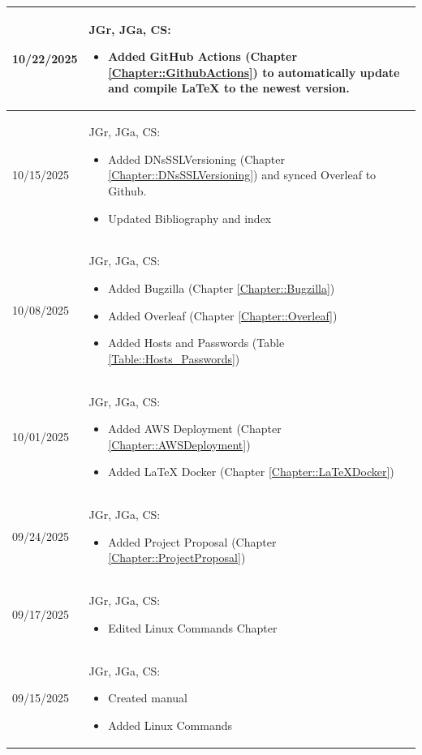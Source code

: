 \begin{longtable}{|l||p{12.5cm}|}
10/22/2025 & JGr, JGa, CS:
\begin{itemize}[topsep=0pt,itemsep=0pt,parsep=0pt,partopsep=0pt,leftmargin=12pt]
\item Added GitHub Actions (Chapter \ref{Chapter::GithubActions}) to automatically update and compile LaTeX to the newest version.
\end{itemize} 
\\ \hline

10/15/2025 & JGr, JGa, CS:
\begin{itemize}[topsep=0pt,itemsep=0pt,parsep=0pt,partopsep=0pt,leftmargin=12pt]
\item Added DNsSSLVersioning (Chapter \ref{Chapter::DNsSSLVersioning}) and synced Overleaf to Github.
\item Updated Bibliography and index
\end{itemize} 
\\ \hline

10/08/2025 & JGr, JGa, CS:
\begin{itemize}[topsep=0pt,itemsep=0pt,parsep=0pt,partopsep=0pt,leftmargin=12pt]
\item Added Bugzilla (Chapter \ref{Chapter::Bugzilla})
\item Added Overleaf (Chapter \ref{Chapter::Overleaf})
\item Added Hosts and Passwords (Table \ref{Table::Hosts_Passwords})
\end{itemize} 
\\ \hline

10/01/2025 & JGr, JGa, CS:
\begin{itemize}[topsep=0pt,itemsep=0pt,parsep=0pt,partopsep=0pt,leftmargin=12pt]
\item Added AWS Deployment (Chapter \ref{Chapter::AWSDeployment})
\item Added LaTeX Docker (Chapter \ref{Chapter::LaTeXDocker})
\end{itemize} 
\\ \hline

09/24/2025 & JGr, JGa, CS:
\begin{itemize}[topsep=0pt,itemsep=0pt,parsep=0pt,partopsep=0pt,leftmargin=12pt]
\item Added Project Proposal (Chapter \ref{Chapter::ProjectProposal})
\end{itemize} 
\\ \hline

09/17/2025 & JGr, JGa, CS:
\begin{itemize}[topsep=0pt,itemsep=0pt,parsep=0pt,partopsep=0pt,leftmargin=12pt]
\item Edited Linux Commands Chapter
\end{itemize} 
\\ \hline

09/15/2025 & JGr, JGa, CS:
\begin{itemize}[topsep=0pt,itemsep=0pt,parsep=0pt,partopsep=0pt,leftmargin=12pt]
\item Created manual
\item Added Linux Commands
\end{itemize} 
\\ \hline

\end{longtable}

